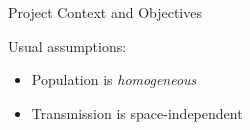 \begin{slide}{Project Context and Objectives}
	
	Usual assumptions:
	\begin{itemize}
		\item Population is \emph{homogeneous}
		\item Transmission is space-independent
	\end{itemize}
\end{slide}